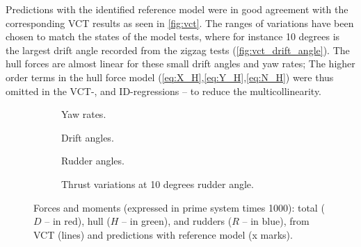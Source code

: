 Predictions with the identified reference model were in good agreement with the corresponding VCT results as seen in \autoref{fig:vct}. The ranges of variations have been chosen to match the states of the model tests, where for instance 10 degrees is the largest drift angle recorded from the zigzag tests (\autoref{fig:vct_drift_angle}). The hull forces are almost linear for these small drift angles and yaw rates; The higher order terms in the hull force model (\autoref{eq:X_H},\autoref{eq:Y_H},\autoref{eq:N_H}) were thus omitted in the VCT-, and ID-regressions -- to reduce the multicollinearity.
\begin{figure}
    \centering
    \begin{subfigure}[b]{0.49\textwidth}
        \centering
        
        \caption{Yaw rates.}
        \label{fig:vct_circle}
    \end{subfigure}
    \hfill
    \begin{subfigure}[b]{0.49\textwidth}
        \centering
        
        \caption{Drift angles.}
        \label{fig:vct_drift_angle}
    \end{subfigure}
    \begin{subfigure}[b]{0.49\textwidth}
        \centering
        
        \caption{Rudder angles.}
        \label{fig:vct_rudder_angle}
    \end{subfigure}
    \hfill
    \begin{subfigure}[b]{0.49\textwidth}
        \centering
        
        \caption{Thrust variations at 10 degrees rudder angle.}
        \label{fig:vct_thrust_variation}
    \end{subfigure}
    \caption{Forces and moments (expressed in prime system times 1000): total ($D$ -- in red), hull ($H$ -- in green), and rudders ($R$ -- in blue), from VCT (lines) and predictions with reference model (x marks).}
    \label{fig:vct}
\end{figure}
